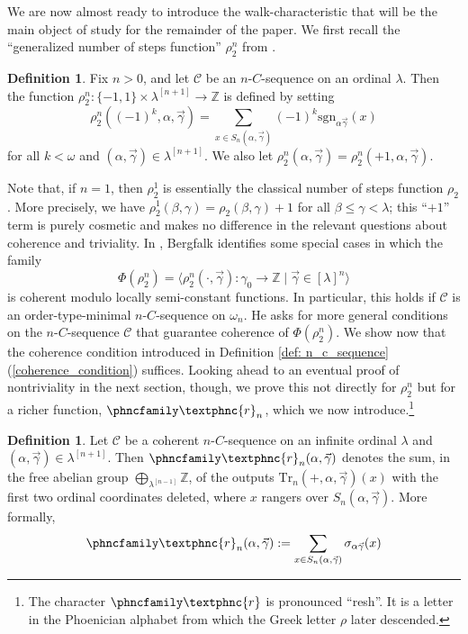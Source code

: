 \documentclass{amsart}
\numberwithin{theorem}{section}
\theoremstyle{definition}
\newtheorem{definition}[theorem]{Definition}
\newcommand{\bb}{\mathbb}
\newcommand{\mc}{\mathcal}
\newcommand{\ra}{\rightarrow}
\newcommand{\Z}{\mathbb{Z}}
\newcommand{\C}{\mathcal{C}}
\newcommand{\Tr}{\mathrm{Tr}}
\newcommand{\resh}{{\phncfamily\textphnc{r}}}
\newcommand{\sgn}{\mathrm{sgn}}
\begin{document}
We are now almost ready to introduce the walk-characteristic that will be the main object of study for 
the remainder of the paper. We first recall the ``generalized number of steps function'' $\rho_2^n$ 
from \cite{bergfalk2024introductionhigherwalks}.

\begin{definition}
  Fix $n > 0$, and let $\C$ be an $n$-$C$-sequence on an ordinal $\lambda$. Then the function 
  $\rho_2^n : \{-1,1\} \times \lambda^{[n+1]} \ra \bb{Z}$ is defined by setting
  \[
    \rho_2^n((-1)^k,\alpha,\vec{\gamma}) = \sum_{x \in S_n(\alpha,\vec{\gamma})} (-1)^k 
    \sgn_{\alpha\vec{\gamma}}(x)
  \]
  for all $k < \omega$ and $(\alpha,\vec{\gamma}) \in \lambda^{[n+1]}$. We also let 
  $\rho_2^n(\alpha,\vec{\gamma}) = \rho_2^n(+1,\alpha,\vec{\gamma})$.
\end{definition}

Note that, if $n = 1$, then $\rho_2^1$ is essentially the classical number of steps function $\rho_2$. 
More precisely, we have $\rho_2^1(\beta,\gamma) = \rho_2(\beta,\gamma) + 1$ for all 
$\beta \leq \gamma < \lambda$; this ``$+1$'' term is purely cosmetic and makes no difference 
in the relevant questions about coherence and triviality. In 
\cite[Theorem 7.2]{bergfalk2024introductionhigherwalks}, Bergfalk identifies some special 
cases in which the family 
\[
  \Phi(\rho_2^n) = \langle \rho_2^n(\cdot,\vec{\gamma}):\gamma_0 \ra \bb{Z} \mid 
  \vec{\gamma} \in [\lambda]^n \rangle
\]
is coherent modulo locally semi-constant functions. In particular, this holds if 
$\mc{C}$ is an order-type-minimal $n$-$C$-sequence on $\omega_n$. He asks for more general 
conditions on the $n$-$C$-sequence $\mc{C}$ that guarantee coherence of $\Phi(\rho_2^n)$. 
We show now that the coherence condition introduced in Definition \ref{def: n_c_sequence}(\ref{coherence_condition}) suffices. Looking ahead to an eventual proof of nontriviality in 
the next section, though, we prove this not directly for $\rho_2^n$ but for a richer function, 
$\resh_n$, which we now introduce.\footnote{The character $\resh$ is pronounced ``resh''. It is 
a letter in the Phoenician alphabet from which the Greek letter $\rho$ later descended.}

\begin{definition}\label{rho2}
Let $\C$ be a coherent $n$-$C$-sequence on an infinite ordinal $\lambda$ and $(\alpha,\vec{\gamma}) \in \lambda^{[n+1]}$. Then $\resh_n(\alpha,\vec\gamma)$ denotes the sum, in the free abelian group $\bigoplus_{\lambda^{[n-1]}}\Z$, of the outputs $\Tr_n(+,\alpha,\vec\gamma)(x)$ with the first two ordinal coordinates deleted, where $x$ rangers over $S_n(\alpha,\vec\gamma)$. More formally,
\[
\resh_n(\alpha,\vec\gamma):=\sum_{x\in S_n(\alpha,\vec\gamma)}\sigma_{\alpha\vec{\gamma}}(x)
\]
\end{definition}
\end{document}
